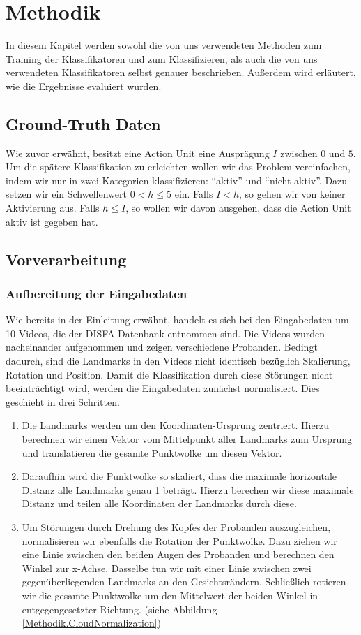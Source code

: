 \chapter{Methodik}\label{ch:methodik}
In diesem Kapitel werden sowohl die von uns verwendeten Methoden zum Training der Klassifikatoren und zum Klassifizieren,
als auch die von uns verwendeten Klassifikatoren selbst genauer beschrieben. Außerdem wird erläutert, wie die Ergebnisse
evaluiert wurden.

\section{Ground-Truth Daten}
Wie zuvor erwähnt, besitzt eine Action Unit eine Ausprägung $I$ zwischen $0$ und $5$. Um die spätere Klassifikation zu erleichten wollen wir das Problem vereinfachen, indem wir nur in zwei Kategorien klassifizieren: "`aktiv"' und "`nicht aktiv"'. Dazu setzen wir ein Schwellenwert $0<h\leq5$ ein. Falls $I<h$, so gehen wir von keiner Aktivierung aus. Falls $h\leq I$, so wollen wir davon ausgehen, dass die Action Unit aktiv ist gegeben hat.
\section{Vorverarbeitung}
\subsection{Aufbereitung der Eingabedaten}\label{Methodik.Aufbereitung}
Wie bereits in der Einleitung erwähnt, handelt es sich bei den Eingabedaten um 10 Videos, die der DISFA Datenbank entnommen sind.
Die Videos wurden nacheinander aufgenommen und zeigen verschiedene Probanden. Bedingt dadurch, sind die Landmarks
in den Videos nicht identisch bezüglich Skalierung, Rotation und Position.\newline
Damit die Klassifikation durch diese Störungen nicht beeinträchtigt wird, werden die Eingabedaten zunächst normalisiert. Dies geschieht
in drei Schritten.
\begin{enumerate}
  \item Die Landmarks werden um den Koordinaten-Ursprung zentriert. Hierzu berechnen wir einen Vektor vom Mittelpunkt aller Landmarks zum Ursprung und translatieren
        die gesamte Punktwolke um diesen Vektor.
  \item Daraufhin wird die Punktwolke so skaliert, dass die maximale horizontale Distanz alle Landmarks genau 1 beträgt. Hierzu berechen wir diese maximale Distanz und
        teilen alle Koordinaten der Landmarks durch diese.
  \item Um Störungen durch Drehung des Kopfes der Probanden auszugleichen,
    normalisieren wir ebenfalls die Rotation der Punktwolke. Dazu ziehen wir
    eine Linie
    zwischen den beiden Augen des Probanden und berechnen den Winkel zur
    x-Achse. Dasselbe tun wir mit einer Linie zwischen zwei gegenüberliegenden
    Landmarks an den Gesichtsrändern. Schließlich rotieren wir die gesamte
    Punktwolke um den Mittelwert der beiden Winkel in entgegengesetzter Richtung.  (siehe Abbildung \ref{Methodik.CloudNormalization})
\end{enumerate}


